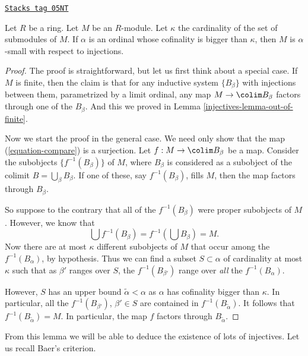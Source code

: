 \begin{proposition}
\label{injectives-proposition-modules-are-small}
\href{https://stacks.math.columbia.edu/tag/05NT}{\texttt{Stacks tag 05NT}}

Let $R$ be a ring. Let $M$ be an $R$-module.
Let $\kappa$ the cardinality of the set of submodules of $M$.
If $\alpha$ is an ordinal whose cofinality is bigger than $\kappa$,
then $M$ is $\alpha$-small with respect to injections.
\end{proposition}

\begin{proof}

The proof is straightforward, but let us first think about a special case.
If $M$ is finite, then the claim is that for any inductive system
$\{B_\beta\}$ with injections between them, parametrized by a
limit ordinal, any map $M \to \colim B_\beta$ factors through one of
the $B_\beta$. And this we proved in
Lemma \ref{injectives-lemma-out-of-finite}.

\medskip\noindent
Now we start the proof in the general case.
We need only show that the map (\ref{equation-compare}) is a surjection.
Let $f : M \to \colim B_\beta$ be a map.
Consider the subobjects $\{f^{-1}(B_\beta)\}$ of $M$, where $B_\beta$
is considered as a subobject of the colimit $B = \bigcup_\beta B_\beta$.
If one of these, say $f^{-1}(B_\beta)$, fills $M$,
then the map factors through $B_\beta$.

\medskip\noindent
So suppose to the contrary that all of the $f^{-1}(B_\beta)$ were proper
subobjects of $M$. However, we know that
$$
\bigcup f^{-1}(B_\beta) = f^{-1}\left(\bigcup B_\beta\right) = M.
$$
Now there are at most $\kappa$ different subobjects of $M$ that occur among
the $f^{-1}(B_\alpha)$, by hypothesis.
Thus we can find a subset $S \subset \alpha$ of cardinality at most
$\kappa$ such that as $\beta'$ ranges over $S$, the
$f^{-1}(B_{\beta'})$ range over \emph{all} the $f^{-1}(B_\alpha)$.

\medskip\noindent
However, $S$ has an upper bound $\widetilde{\alpha} < \alpha$ as
$\alpha$ has cofinality bigger than $\kappa$. In particular, all the
$f^{-1}(B_{\beta'})$, $\beta' \in S$ are contained in
$f^{-1}(B_{\widetilde{\alpha}})$.
It follows that $f^{-1}(B_{\widetilde{\alpha}}) = M$.
In particular, the map $f$ factors through $B_{\widetilde{\alpha}}$.
\end{proof}

From this lemma we will be able to deduce the existence of lots of injectives.
Let us recall Baer's criterion.

